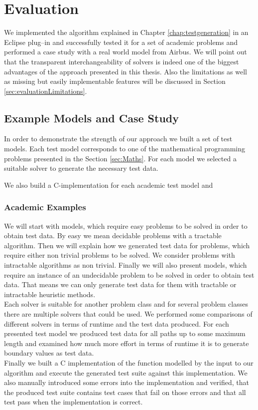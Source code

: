 \chapter{Evaluation}
\label{chap:evaluation}
We implemented the algorithm explained in Chapter \ref{chap:testgeneration} in an Eclipse plug--in and successfully tested it for a set of academic problems and performed a case study with a real world model from Airbus. We will point out that the transparent interchangeability of solvers is indeed one of the biggest advantages of the approach presented in this thesis. Also the limitations as well as missing but easily implementable features will be discussed in Section \ref{sec:evaluationLimitations}.
\section{Example Models and Case Study}
In order to demonstrate the strength of our approach we built a set of test models. Each test model corresponds to one of the mathematical programming problems presented in the  Section \ref{sec:Maths}. For each model we selected a suitable solver to generate the necessary test data. 

We also build a C-implementation for each academic test model and 
\subsection{Academic Examples}
\label{sec:evaluationAcademicModels}
We will start with models, which require easy problems to be solved in order to obtain test data. By easy we mean decidable problems with a tractable algorithm. Then we will explain how we generated test data for problems, which require either non trivial problems to be solved. We consider problems with intractable algorithms as non trivial. Finally we will also present models, which require an instance of an undecidable problem to be solved in order to obtain test data. That means we can only generate test data for them with tractable or intractable heuristic methods.\\
Each solver is suitable for another problem class and for several problem classes there are multiple solvers that could be used. We performed some comparisons of different solvers in terms of runtime and the test data produced. For each presented test model we produced test data for all paths up to some maximum length and examined how much more effort in terms of runtime it is to generate boundary values as test data.\\
Finally we built a C implementation of the function modelled by the input to our algorithm and execute the generated test suite against this implementation. We also manually introduced some errors into the implementation and verified, that the produced test suite contains test cases that fail on those errors and that all test pass when the implementation is correct.
